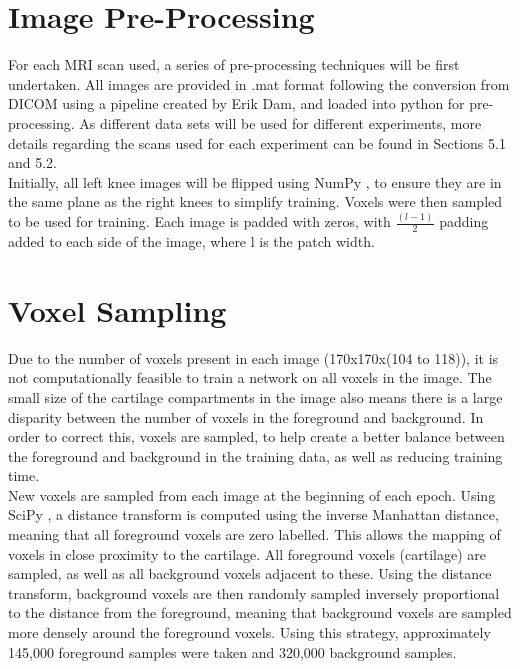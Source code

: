 \documentclass[11pt,a4paper]{memoir}
\numberwithin{figure}{section}
\numberwithin{table}{section}
\numberwithin{equation}{section}
\begin{document}
\section{Image Pre-Processing}
For each MRI scan used, a series of pre-processing techniques will be first undertaken. All images are provided in .mat format following the conversion from DICOM using a pipeline created by Erik Dam, and loaded into python for pre-processing. As different data sets will be used for different experiments, more details regarding the scans used for each experiment can be found in Sections 5.1 and 5.2.  \\

Initially, all left knee images will be flipped using NumPy \cite{vanderWalt2011TheComputation}, to ensure they are in the same plane as the right knees to simplify training. Voxels were then sampled to be used for training. Each image is padded with zeros, with $\frac{(l - 1)}{2}$ padding added to each side of the image, where l is the patch width.

\section{Voxel Sampling}
Due to the number of voxels present in each image (170x170x(104 to 118)), it is not computationally feasible to train a network on all voxels in the image. The small size of the cartilage compartments in the image also means there is a large disparity between the number of voxels in the foreground and background. In order to correct this, voxels are sampled, to help create a better balance between the foreground and background in the training data, as well as reducing training time. \\

New voxels are sampled from each image at the beginning of each epoch. Using SciPy \cite{vanderWalt2011TheComputation}, a distance transform is computed using the inverse Manhattan distance, meaning that all foreground voxels are zero labelled. This allows the mapping of voxels in close proximity to the cartilage. All foreground voxels (cartilage) are sampled, as well as all background voxels adjacent to these. Using the distance transform, background voxels are then randomly sampled inversely proportional to the distance from the foreground, meaning that background voxels are sampled more densely around the foreground voxels. Using this strategy, approximately 145,000 foreground samples were taken and 320,000 background samples.\\
\end{document}
